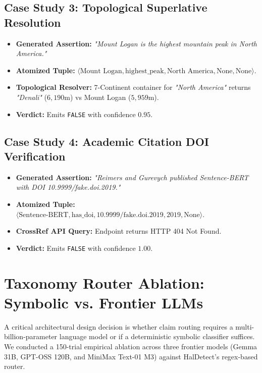 \subsection{Case Study 3: Topological Superlative Resolution}
\begin{itemize}
    \item \textbf{Generated Assertion:} \textit{"Mount Logan is the highest mountain peak in North America."}
    \item \textbf{Atomized Tuple:} $\langle \text{Mount Logan}, \text{highest\_peak}, \text{North America}, \text{None}, \text{None} \rangle$.
    \item \textbf{Topological Resolver:} 7-Continent container for \textit{"North America"} returns \textit{"Denali"} ($6,190\text{m}$) vs Mount Logan ($5,959\text{m}$).
    \item \textbf{Verdict:} Emits \texttt{FALSE} with confidence $0.95$.
\end{itemize}

\subsection{Case Study 4: Academic Citation DOI Verification}
\begin{itemize}
    \item \textbf{Generated Assertion:} \textit{"Reimers and Gurevych published Sentence-BERT with DOI 10.9999/fake.doi.2019."}
    \item \textbf{Atomized Tuple:} $\langle \text{Sentence-BERT}, \text{has\_doi}, \text{10.9999/fake.doi.2019}, 2019, \text{None} \rangle$.
    \item \textbf{CrossRef API Query:} Endpoint returns HTTP 404 Not Found.
    \item \textbf{Verdict:} Emits \texttt{FALSE} with confidence $1.00$.
\end{itemize}

\section{Taxonomy Router Ablation: Symbolic vs. Frontier LLMs}
\label{sec:router_ablation}

A critical architectural design decision is whether claim routing requires a multi-billion-parameter language model or if a deterministic symbolic classifier suffices. We conducted a 150-trial empirical ablation across three frontier models (Gemma 31B, GPT-OSS 120B, and MiniMax Text-01 M3) against HalDetect's regex-based router.

